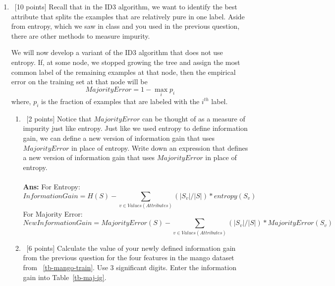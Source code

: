 \documentclass[12pt, fullpage,letterpaper]{article}
\begin{document}
\begin{enumerate}
\item~[10 points] Recall that in the ID3 algorithm, we want to identify the best attribute that splits the examples that are relatively pure in one label.
  Aside from entropy, which we saw in class and you used in the previous question, there are other methods to measure impurity.

  We will now develop a variant of the ID3 algorithm that does not use entropy. If, at some node, we stopped growing the tree and assign the most common label of the remaining examples at that node, then the empirical error on the training set at that node will be
  $$MajorityError = 1 - \max_{i}p_i$$
  where, $p_i$ is the fraction of examples that are labeled with the $i^{th}$ label.



  

  \begin{enumerate}
  \item~[2 points]   Notice that $MajorityError$ can be thought of as a measure of impurity just like entropy. Just like we used entropy to define information gain, we can define a new version of information gain that uses $MajorityError$ in place of entropy. Write down an expression that defines a new version of information gain that uses $MajorityError$ in place of entropy.\\\\
    \textbf{Ans: }For Entropy: \\\[Information Gain = H(S) - \sum_{v \in Values(Attributes)}(|S_v|/|S|)* entropy(S_v)\]
    For Majority Error: \\\[New Information Gain = MajorityError(S) - \sum_{v \in Values(Attributes)} (|S_v|/|S|)*MajorityError(S_v) \]
  \item~[6 points] Calculate the value of your newly defined information gain from the previous question for the four features in the mango dataset from ~\ref{tb-mango-train}. Use 3 significant digits. Enter the information gain into Table~\ref{tb-maj-ig}.
    

\end{enumerate}
\end{enumerate}
\end{document}
